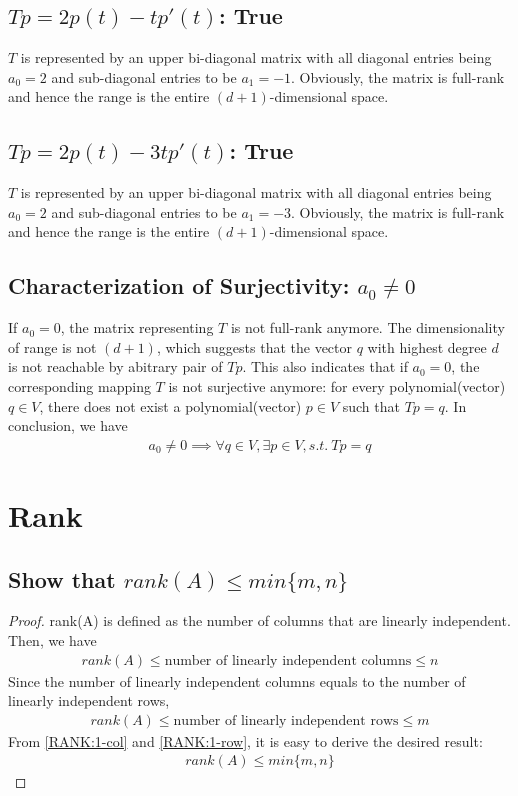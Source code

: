 \documentclass[11pt,a4paper]{report}
\begin{document}
\subsection{$Tp=2p(t)-tp'(t)$: True}
$T$ is represented by an upper bi-diagonal matrix with all diagonal entries
being $a_0=2$ and sub-diagonal entries to be $a_1=-1$. Obviously, the matrix
is full-rank and hence the range is the entire $(d+1)$-dimensional space.
\subsection{$Tp=2p(t)-3tp'(t)$: True}
$T$ is represented by an upper bi-diagonal matrix with all diagonal entries
being $a_0=2$ and sub-diagonal entries to be $a_1=-3$.
Obviously, the matrix is full-rank and hence the range is the entire
$(d+1)$-dimensional space.
\subsection{Characterization of Surjectivity: $a_0 \not = 0$}

If $a_0 = 0$, the matrix representing $T$ is not full-rank anymore. The
dimensionality of range is not $(d+1)$, which suggests that the vector $q$ with
highest degree $d$ is not reachable by abitrary pair of $Tp$. This also
indicates that if $a_0 = 0$,  the corresponding mapping $T$ is not surjective
anymore: for every polynomial(vector) $q \in V$, there does not exist a
polynomial(vector) $p \in V$ such that $Tp = q$. In conclusion, we have
\begin{align}
    a_0 \not = 0 \implies \forall q \in V, \exists p \in V, s.t.\ Tp=q
\end{align}

\newcommand{\rank}[1]{rank(#1)}
\section{Rank}
\subsection{Show that $\rank{A} \leq min\{m, n\}$}
\begin{proof}
\rank{A} is defined as the number of columns that are linearly
independent. Then, we have 
\begin{align}  \label{RANK:1-col}
    \rank{A} \leq \text{number of linearly independent columns} \leq n
\end{align}
Since the number of linearly independent columns equals to the
number of linearly independent rows, 
\begin{align} \label{RANK:1-row}
    \rank{A} \leq \text{number of linearly independent rows} \leq m
\end{align}
From \eqref{RANK:1-col} and \eqref{RANK:1-row}, it is easy to derive the
desired result:
\begin{align} \label{RANK:1-result}
    \rank{A} \leq  min\{m, n\}
\end{align}
\end{proof}
\end{document}
